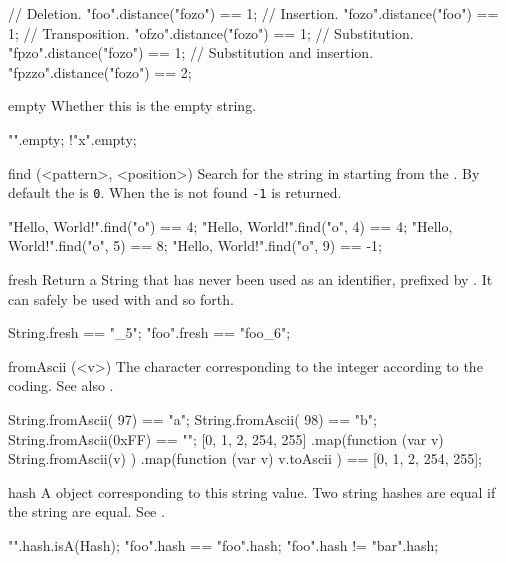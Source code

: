 \begin{urbiscriptapi}
\begin{urbiassert}
// Deletion.
"foo".distance("fozo") == 1;
// Insertion.
"fozo".distance("foo") == 1;
// Transposition.
"ofzo".distance("fozo") == 1;
// Substitution.
"fpzo".distance("fozo") == 1;
// Substitution and insertion.
"fpzzo".distance("fozo") == 2;
\end{urbiassert}


\item[empty] Whether this is the empty string.
\begin{urbiassert}
  "".empty;
!"x".empty;
\end{urbiassert}


\item[find](<pattern>, <position>)%
  Search for the  string in \this starting from the
  .  By default the  is \lstinline|0|.  When the
   is not found \lstinline|-1| is returned.
\begin{urbiassert}
"Hello, World!".find("o") == 4;
"Hello, World!".find("o", 4) == 4;
"Hello, World!".find("o", 5) == 8;
"Hello, World!".find("o", 9) == -1;
\end{urbiassert}


\item[fresh] Return a String that has never been used as an identifier,
  prefixed by \this.  It can safely be used with
   and so forth.
\begin{urbiassert}
String.fresh == "_5";
"foo".fresh == "foo_6";
\end{urbiassert}

\item[fromAscii](<v>) The character corresponding to the integer 
  according to the  coding.  See also .
\begin{urbiassert}
String.fromAscii(  97) == "a";
String.fromAscii(  98) == "b";
String.fromAscii(0xFF) == "\xff";
[0, 1, 2, 254, 255]
  .map(function (var v) { String.fromAscii(v) })
  .map(function (var v) { v.toAscii })
  == [0, 1, 2, 254, 255];
\end{urbiassert}

\item[hash]%
  A  object corresponding to this string value. Two string
  hashes are equal if the string are equal. See .

\begin{urbiassert}
"".hash.isA(Hash);
"foo".hash == "foo".hash;
"foo".hash != "bar".hash;
\end{urbiassert}


\end{urbiscriptapi}
